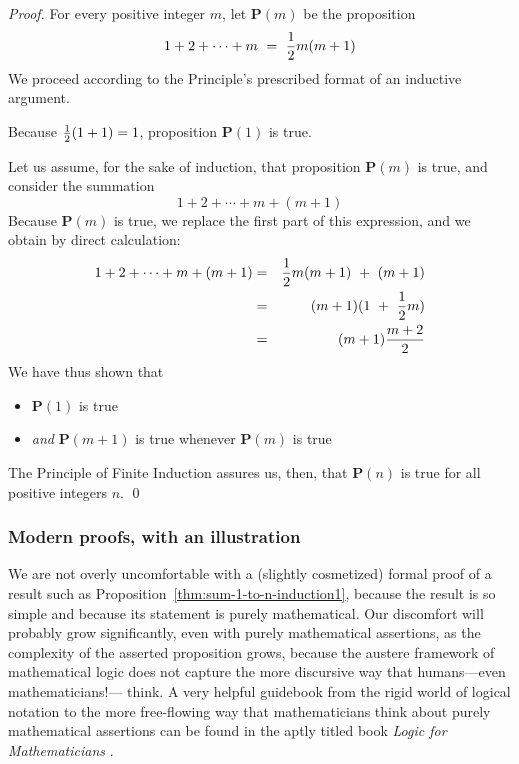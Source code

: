 \bigskip

\begin{proof}
For every positive integer $m$, let {\bf P}$(m)$ be the proposition
\[  1 + 2 + \cdots + m \ = \ {1 \over 2} m(m+1) \]
We proceed according to the Principle's prescribed format of an inductive argument.

Because ${1 \over 2}(1+1) = 1$, proposition {\bf P}$(1)$ is true.

Let us assume, for the sake of induction, that proposition {\bf P}$(m)$ is true, and consider the summation
\[ 1 + 2 + \cdots + m + (m+1) \]
Because {\bf P}$(m)$ is true, we replace the first part of this expression, and we obtain by direct calculation:
\begin{eqnarray*}
1 + 2 + \cdots + m + (m+1)
  & = & {1 \over 2} m(m+1) \ + \ (m+1) \\
  & = & (m+1) ( 1 \ + \ {1 \over 2} m ) \\
  & = & (m+1)\frac{m+2}{2} 
\end{eqnarray*}
We have thus shown that
\begin{itemize}
\item
{\bf P}$(1)$ is true
\item
{\em and}
{\bf P}$(m+1)$ is true whenever {\bf P}$(m)$ is true
\end{itemize}
The Principle of Finite Induction assures us, then, that {\bf P}$(n)$ is true for all positive integers $n$.  \qed
\end{proof}


\subsubsection{Modern proofs, with an illustration}
\label{sec:modern-proof}

We are not overly uncomfortable with a (slightly cosmetized) formal proof of a result such as Proposition~\ref{thm:sum-1-to-n-induction1}, because the result is so simple and because its statement is purely mathematical.  Our discomfort will probably grow significantly, even with purely mathematical assertions, as the complexity of the asserted proposition grows, because the austere framework of mathematical logic does not capture the more discursive way that
humans---even mathematicians!--- think.  A very helpful guidebook from the rigid world of logical notation to the more free-flowing way that mathematicians think about purely mathematical assertions can be found in the aptly titled book {\it Logic for Mathematicians} \cite{Rosser53}.

